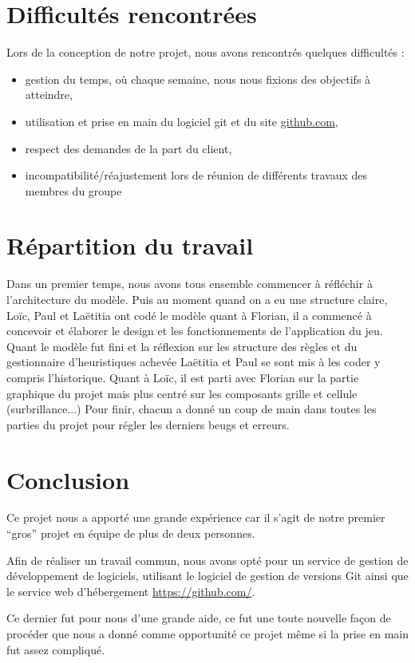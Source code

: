 \newpage
\section{Difficultés rencontrées}
Lors de la conception de notre projet, nous avons rencontrés quelques difficultés :
\begin{itemize}
 \item gestion du temps, où chaque semaine, nous nous fixions des objectifs à atteindre,
 \item utilisation et prise en main du logiciel git et du site 
	    \href{https://github.com/yuki1996/Sudoku}{github.com}, 
 \item respect des demandes de la part du client, 
 \item incompatibilité/réajustement lors de réunion de différents travaux des membres du groupe
\end{itemize}
\section{Répartition du travail}
Dans un premier temps, nous avons tous ensemble commencer à réfléchir à l'architecture du modèle.
Puis au moment quand on a eu une structure claire, Loïc, Paul et Laëtitia ont codé le modèle quant
à Florian, il a commencé à concevoir et élaborer le design et les fonctionnements de l'application du jeu.
Quant le modèle fut fini et la réflexion sur les structure des règles et du gestionnaire d'heuristiques
achevée Laëtitia et Paul se sont mis à les coder y compris l'historique. Quant à Loïc, il est parti avec 
Florian sur la partie graphique du projet mais plus centré sur les composants grille et cellule (surbrillance...)
Pour finir, chacun a donné un coup de main dans toutes les parties du projet pour régler les derniers beugs et erreurs.

\newpage
\section{Conclusion}
Ce projet nous a apporté une grande expérience car il s'agit 
de notre premier ``gros'' projet en équipe de plus de deux personnes.

Afin de réaliser un travail commun, nous avons opté pour un service 
de gestion de développement de logiciels, utilisant le logiciel 
de gestion de versions Git ainsi que le service web d'hébergement \url{https://github.com/}.

Ce dernier fut pour nous d'une grande aide, ce fut une toute nouvelle façon de 
procéder que nous a donné comme opportunité ce projet même si la prise en main 
fut assez compliqué.

